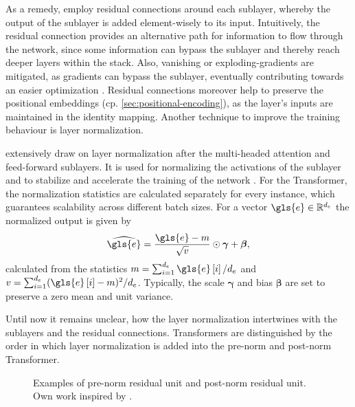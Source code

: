 As a remedy, \textcite[][3]{vaswaniAttentionAllYou2017} employ residual connections around each sublayer, whereby the output of the sublayer is added element-wisely to its input. Intuitively, the residual connection provides an alternative path for information to flow through the network, since some information can bypass the sublayer and thereby reach deeper layers within the stack. Also, vanishing or \glspl{exploding-gradient} are mitigated, as gradients can bypass the sublayer, eventually contributing towards an easier optimization \autocite[][3591]{liuRethinkingSkipConnection2020}. Residual connections moreover help to preserve the positional embeddings (cp. \cref{sec:positional-encoding}), as the layer's inputs are maintained in the identity mapping. Another technique to improve the training behaviour is layer normalization.

\textcite[][3]{vaswaniAttentionAllYou2017} extensively draw on layer normalization \autocite[][4]{baLayerNormalization2016} after the multi-headed attention and feed-forward sublayers. It is used for normalizing the activations of the sublayer and to stabilize and accelerate the training of the network \autocite[][2]{baLayerNormalization2016}. For the Transformer, the normalization statistics are calculated separately for every instance, which guarantees scalability across different batch sizes. For a vector $\gls{e}\in \mathbb{R}^{d_e}$ the normalized output is given by
\begin{equation}
    \widehat{\gls{e}}=\frac{\gls{e}-m}{\sqrt{v}} \odot \boldsymbol{\gamma}+\boldsymbol{\beta},
\end{equation}
calculated from the statistics $m = \sum_{i=1}^{d_{e}} \gls{e}\left[i\right] / d_{e}$ and $v = \sum_{i=1}^{d_{e}}(\gls{e}\left[i\right]-m)^2 / d_{e}$. Typically, the scale $\boldsymbol{\gamma}$ and bias $\boldsymbol{\beta}$ are set to preserve a zero mean and unit variance.

Until now it remains unclear, how the layer normalization intertwines with the sublayers and the residual connections. Transformers are distinguished by the order in which layer normalization is added into the pre-norm and post-norm Transformer.
\begin{figure}[ht]
    \hfill
    \hfill
    \hfill\null
    \caption[Pre-norm residual unit and post-norm residual unit]{Examples of pre-norm residual unit and post-norm residual unit. Own work inspired by \textcite[][2]{wangLearningDeepTransformer2019}.}
    \label{fig:norm-residual}
\end{figure}


